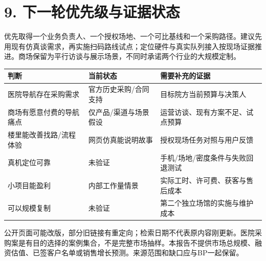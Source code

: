 \documentclass[UTF8,10pt,fontset=fandol]{ctexart}
\begin{document}
\section*{9. 下一轮优先级与证据状态}
优先取得一个业务负责人、一个授权场地、一个可比基线和一个采购路径。建议先用现有仿真谈需求，再实施扫码路线试点；定位硬件与真实队列接入按现场证据推进。商场保留为平行访谈与展示场景，不同时承诺两个行业的大规模定制。\par
\begingroup\small\begin{longtable}{>{\raggedright\arraybackslash}p{}>{\raggedright\arraybackslash}p{}>{\raggedright\arraybackslash}p{}}
\textbf{判断} & \textbf{当前状态} & \textbf{需要补充的证据}\\\hline\endhead
医院导航存在采购需求 & 官方历史采购/合同支持 & 目标院方当前预算与决策人\\\hline
商场有愿意付费的导航痛点 & 仅产品/渠道与场景假设 & 运营访谈、现有方案不足、试点预算\\\hline
楼里能改善找路/流程体验 & 网页仿真能说明故事 & 授权现场任务对照与用户反馈\\\hline
真机定位可靠 & 未验证 & 手机/场地/密度条件与失败回退测试\\\hline
小项目能盈利 & 内部工作量情景 & 实际工时、许可费、获客与售后成本\\\hline
可以规模复制 & 未验证 & 第二个独立场馆的实施与维护成本\\\hline
\end{longtable}\endgroup
公开页面可能改版，部分旧链接有重定向；检索日期不代表原内容刚更新。医院采购案是有目的选择的案例集合，不是完整市场抽样。本报告不提供市场总规模、融资估值、已签客户名单或销售增长预测。来源范围和缺口应与BP一起保留。\par
\end{document}
